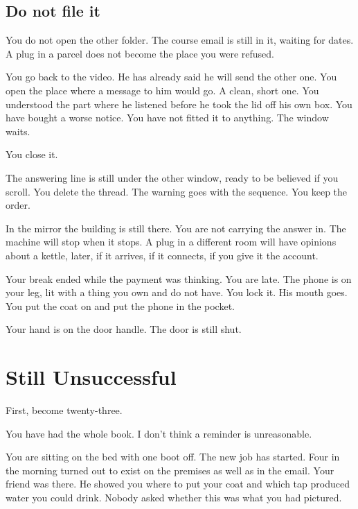 \documentclass[11pt,oneside]{book}
\begin{document}
\section*{Do not file it}

You do not open the other folder. The course email is still in it, waiting for dates. A plug in a parcel does not become the place you were refused.

You go back to the video. He has already said he will send the other one. You open the place where a message to him would go. A clean, short one. You understood the part where he listened before he took the lid off his own box. You have bought a worse notice. You have not fitted it to anything. The window waits.

You close it.

The answering line is still under the other window, ready to be believed if you scroll. You delete the thread. The warning goes with the sequence. You keep the order.

In the mirror the building is still there. You are not carrying the answer in. The machine will stop when it stops. A plug in a different room will have opinions about a kettle, later, if it arrives, if it connects, if you give it the account.

Your break ended while the payment was thinking. You are late. The phone is on your leg, lit with a thing you own and do not have. You lock it. His mouth goes. You put the coat on and put the phone in the pocket.

Your hand is on the door handle. The door is still shut.

\chapter*{Still Unsuccessful}

First, become twenty-three.

You have had the whole book. I don't think a reminder is unreasonable.

You are sitting on the bed with one boot off. The new job has started. Four in the morning turned out to exist on the premises as well as in the email. Your friend was there. He showed you where to put your coat and which tap produced water you could drink. Nobody asked whether this was what you had pictured.
\end{document}
